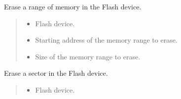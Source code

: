 \documentclass[letterpaper,10pt,english]{sphinxmanual}
\begin{document}
\begin{fulllineitems}
\begin{fulllineitems}
\label{\detokenize{cplddocs:management_flash.MngProgFlash.FlashDevice_erase}}
\pysigstartsignatures
{}
\pysigstopsignatures
\sphinxAtStartPar
Erase a range of memory in the Flash device.
\begin{quote}\begin{description}
\begin{itemize}
\item {} 
\sphinxAtStartPar
{} \textendash{} Flash device.

\item {} 
\sphinxAtStartPar
{} \textendash{} Starting address of the memory range to erase.

\item {} 
\sphinxAtStartPar
{} \textendash{} Size of the memory range to erase.

\end{itemize}

\end{description}\end{quote}

\end{fulllineitems}


\begin{fulllineitems}
\label{\detokenize{cplddocs:management_flash.MngProgFlash.FlashDevice_eraseSector}}
\pysigstartsignatures
{}
\pysigstopsignatures
\sphinxAtStartPar
Erase a sector in the Flash device.
\begin{quote}\begin{description}
\begin{itemize}
\item {} 
\sphinxAtStartPar
{} \textendash{} Flash device.


\end{itemize}
\end{description}
\end{quote}
\end{fulllineitems}
\end{fulllineitems}
\end{document}
